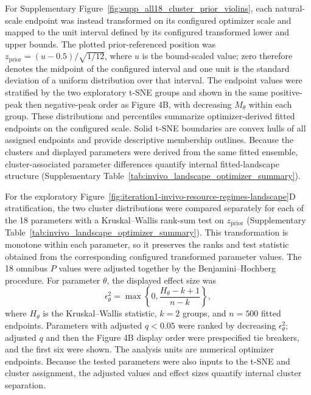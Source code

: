 \documentclass[11pt]{article}
\begin{document}
For Supplementary Figure~\ref{fig:supp_all18_cluster_prior_violins}, each natural-scale endpoint was instead transformed on its configured optimizer scale and mapped to the unit interval defined by its configured transformed lower and upper bounds. The plotted prior-referenced position was \(z_{\mathrm{prior}}=(u-0.5)/\sqrt{1/12}\), where \(u\) is the bound-scaled value; zero therefore denotes the midpoint of the configured interval and one unit is the standard deviation of a uniform distribution over that interval. The endpoint values were stratified by the two exploratory t-SNE groups and shown in the same positive-peak then negative-peak order as Figure 4B, with decreasing $M_\theta$ within each group. These distributions and percentiles summarize optimizer-derived fitted endpoints on the configured scale. Solid t-SNE boundaries are convex hulls of all assigned endpoints and provide descriptive membership outlines. Because the clusters and displayed parameters were derived from the same fitted ensemble, cluster-associated parameter differences quantify internal fitted-landscape structure (Supplementary Table~\ref{tab:invivo_landscape_optimizer_summary}).

For the exploratory Figure~\ref{fig:iteration1-invivo-resource-regimes-landscape}D stratification, the two cluster distributions were compared separately for each of the 18 parameters with a Kruskal--Wallis rank-sum test on \(z_{\mathrm{prior}}\) (Supplementary Table~\ref{tab:invivo_landscape_optimizer_summary}). This transformation is monotone within each parameter, so it preserves the ranks and test statistic obtained from the corresponding configured transformed parameter values. The 18 omnibus \(P\) values were adjusted together by the Benjamini--Hochberg procedure. For parameter \(\theta\), the displayed effect size was
\begin{equation}
\epsilon^2_{\theta}
=
\max\!\left\{0,\frac{H_{\theta}-k+1}{n-k}\right\},
\label{eq:appendix_cluster_epsilon_squared}
\end{equation}
where \(H_{\theta}\) is the Kruskal--Wallis statistic, \(k=2\) groups, and \(n=500\) fitted endpoints. Parameters with adjusted \(q<0.05\) were ranked by decreasing \(\epsilon^2_{\theta}\); adjusted \(q\) and then the Figure 4B display order were prespecified tie breakers, and the first six were shown. The analysis units are numerical optimizer endpoints. Because the tested parameters were also inputs to the t-SNE and cluster assignment, the adjusted values and effect sizes quantify internal cluster separation.
\end{document}

